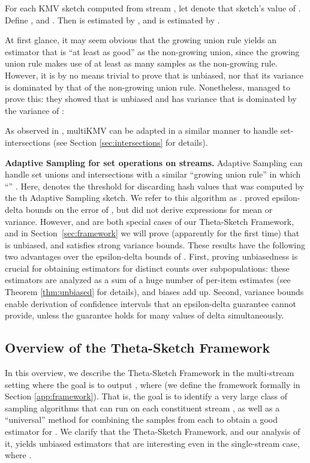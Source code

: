 \documentclass{article}
\newcommand{\edit}[1]{{#1}}
\newcommand{\kedit}[1]{{#1}}
\begin{document}
For each KMV  sketch  computed from stream , let  denote that sketch's value of . 
Define , and .
Then  is estimated by , 
and   is estimated by . 

\edit{At first glance, it may seem obvious that the growing union rule yields an estimator that is 
``at least as good'' as the non-growing union, since the growing union rule makes use of at least as many samples
as the non-growing rule. However, it is by no means trivial to prove that  is unbiased,
nor that its variance is dominated by that of the non-growing union rule.}
\kedit{Nonetheless, \cite{cohen2009leveraging} managed to prove this: they showed that  is unbiased and has
variance that is dominated by the variance of :}

As observed in \cite{cohen2009leveraging}, multiKMV can be adapted in a similar manner to handle set-intersections 
\edit{(see Section \ref{sec:intersections} for details).}




\medskip
\noindent \textbf{Adaptive Sampling for set operations on streams.} 
Adaptive Sampling can handle set unions and intersections with a \edit{similar ``growing union rule''} in which ``'' . Here,  denotes the threshold for discarding hash values that was computed by the th Adaptive Sampling sketch.
We refer to this algorithm as . 
\cite{gibbons2001estimating} proved epsilon-delta bounds on the error of , but did not derive expressions for mean or variance. 
However,  and  are both special cases
of our Theta-Sketch Framework, and in Section~\ref{sec:framework}
we will prove (apparently for the first time) that  is unbiased, and satisfies strong variance bounds.
\edit{These results have the following two advantages over the epsilon-delta bounds of \cite{gibbons2001estimating}. 
First, proving unbiasedness is crucial for obtaining estimators for distinct counts over subpopulations: these estimators are analyzed as a sum of a huge number of per-item estimates (see Theorem \ref{thm:unbiased} for details), and biases add up. Second, variance bounds enable derivation of confidence intervals that an epsilon-delta guarantee cannot provide, unless the guarantee holds for many values of delta simultaneously.
}


\subsection{Overview of the Theta-Sketch Framework}
In this overview, we describe the Theta-Sketch Framework in the multi-stream setting where the goal is to output , where  (we define the framework formally in Section \ref{app:framework}).
That is, the goal is to identify a very large class of sampling algorithms that can run on each constituent stream ,
as well as a ``universal'' method for combining the samples from each  to obtain a good estimator for .
We clarify that the Theta-Sketch Framework, and our analysis of it, yields unbiased estimators that are interesting even in the single-stream case, where .
\end{document}
